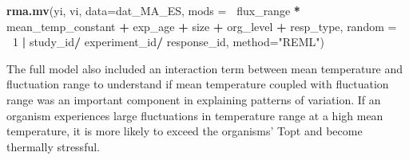 \documentclass[12pt,twoside]{reedthesis}
\newenvironment{Shaded}{\begin{snugshade}}{\end{snugshade}}
\newcommand{\DataTypeTok}[1]{\textcolor[rgb]{0.13,0.29,0.53}{#1}}
\newcommand{\DecValTok}[1]{\textcolor[rgb]{0.00,0.00,0.81}{#1}}
\newcommand{\KeywordTok}[1]{\textcolor[rgb]{0.13,0.29,0.53}{\textbf{#1}}}
\newcommand{\NormalTok}[1]{#1}
\newcommand{\OperatorTok}[1]{\textcolor[rgb]{0.81,0.36,0.00}{\textbf{#1}}}
\newcommand{\StringTok}[1]{\textcolor[rgb]{0.31,0.60,0.02}{#1}}
\begin{document}
\begin{Shaded}
\begin{Highlighting}[]
\KeywordTok{rma.mv}\NormalTok{(yi, vi, }\DataTypeTok{data=}\NormalTok{dat_MA_ES, }\DataTypeTok{mods =} \OperatorTok{~}\NormalTok{flux_range }\OperatorTok{*}\StringTok{ }\NormalTok{mean_temp_constant }
       \OperatorTok{+}\StringTok{ }\NormalTok{exp_age }\OperatorTok{+}\StringTok{ }\NormalTok{size }\OperatorTok{+}\StringTok{ }\NormalTok{org_level }\OperatorTok{+}\StringTok{ }\NormalTok{resp_type, }
               \DataTypeTok{random =} \OperatorTok{~}\DecValTok{1} \OperatorTok{|}\StringTok{  }\NormalTok{study_id}\OperatorTok{/}\StringTok{ }\NormalTok{experiment_id}\OperatorTok{/}\StringTok{ }\NormalTok{response_id,}
                 \DataTypeTok{method=}\StringTok{"REML"}\NormalTok{) }
\end{Highlighting}
\end{Shaded}
The full model also included an interaction term between mean temperature and fluctuation range to understand if mean temperature coupled with fluctuation range was an important component in explaining patterns of variation. If an organism experiences large fluctuations in temperature range at a high mean temperature, it is more likely to exceed the organisms' Topt and become thermally stressful.
\end{document}
